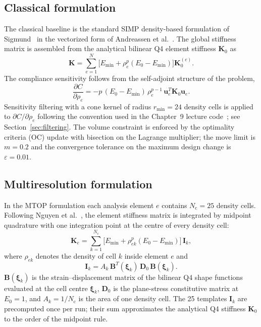 \documentclass[11pt,a4paper]{article}
\begin{document}
\subsection{Classical formulation}

The classical baseline is the standard SIMP density-based formulation of Sigmund~\cite{sigmund2001top99} in the vectorized form of Andreassen et al.~\cite{andreassen2011top88}. The global stiffness matrix is assembled from the analytical bilinear Q4 element stiffness $\mathbf{K}_{0}$ as
\begin{equation}
  \mathbf{K} = \sum_{e=1}^{N}\bigl[E_{\min}+\rho_{e}^{p}(E_{0}-E_{\min})\bigr]\mathbf{K}_{0}^{(e)}.
  \label{eq:classical-K}
\end{equation}
The compliance sensitivity follows from the self-adjoint structure of the problem,
\begin{equation}
  \frac{\partial C}{\partial \rho_{e}}
  = -p\,(E_{0}-E_{\min})\,\rho_{e}^{p-1}\,\mathbf{u}_{e}^{T}\mathbf{K}_{0}\mathbf{u}_{e}.
  \label{eq:classical-sens}
\end{equation}
Sensitivity filtering with a cone kernel of radius $r_{\min}=24$ density cells is applied to $\partial C/\partial \rho_{e}$ following the convention used in the Chapter~9 lecture code~\cite{schevenels2021chapter9}; see Section~\ref{sec:filtering}. The volume constraint is enforced by the optimality criteria (OC) update with bisection on the Lagrange multiplier; the move limit is $m=0.2$ and the convergence tolerance on the maximum design change is $\varepsilon=0.01$.

\subsection{Multiresolution formulation}

In the MTOP formulation each analysis element $e$ contains $N_{\mathrm{c}}=25$ density cells. Following Nguyen et al.~\cite{nguyen2010mtop}, the element stiffness matrix is integrated by midpoint quadrature with one integration point at the centre of every density cell:
\begin{equation}
  \mathbf{K}_{e} = \sum_{k=1}^{N_{\mathrm{c}}}\bigl[E_{\min}+\rho_{ek}^{p}(E_{0}-E_{\min})\bigr]\,\mathbf{I}_{k},
  \label{eq:mtop-K}
\end{equation}
where $\rho_{ek}$ denotes the density of cell $k$ inside element $e$ and
\begin{equation}
  \mathbf{I}_{k} = A_{k}\,\mathbf{B}^{T}(\boldsymbol{\xi}_{k})\,\mathbf{D}_{0}\,\mathbf{B}(\boldsymbol{\xi}_{k}).
  \label{eq:mtop-Ik}
\end{equation}
$\mathbf{B}(\boldsymbol{\xi}_{k})$ is the strain--displacement matrix of the bilinear Q4 shape functions evaluated at the cell centre $\boldsymbol{\xi}_{k}$, $\mathbf{D}_{0}$ is the plane-stress constitutive matrix at $E_{0}=1$, and $A_{k}=1/N_{\mathrm{c}}$ is the area of one density cell. The 25 templates $\mathbf{I}_{k}$ are precomputed once per run; their sum approximates the analytical Q4 stiffness $\mathbf{K}_{0}$ to the order of the midpoint rule.
\end{document}
